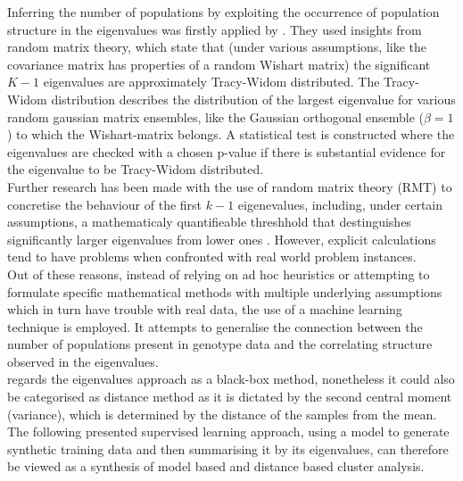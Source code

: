 \documentclass[a4paper, 11pt]{article}
\begin{document}
Inferring the number of populations by exploiting the occurrence of population structure in the eigenvalues was firstly applied by \cite{patterson2006population}. They used insights from random matrix theory, which state that (under various assumptions, like the covariance matrix has properties of a random Wishart matrix) the significant $K-1$ eigenvalues are approximately Tracy-Widom distributed. The Tracy-Widom distribution describes the distribution of the largest eigenvalue for various random gaussian matrix ensembles, like the Gaussian orthogonal ensemble ($\beta = 1$) to which the Wishart-matrix belongs. A statistical test is constructed where the eigenvalues are checked with a chosen p-value if there is substantial evidence for the eigenvalue to be Tracy-Widom distributed.\\
Further research has been made with the use of random matrix theory (RMT) to concretise the behaviour of the first $k-1$ eigenevalues, including, under certain assumptions, a mathematicaly quantifieable threshhold that destinguishes significantly larger eigenvalues from lower ones \parencite{bryc2013separation}. However, explicit calculations tend to have problems when confronted with real world problem instances.\\
Out of these reasons, instead of relying on ad hoc heuristics or attempting to formulate specific mathematical methods with multiple underlying assumptions which in turn have trouble with real data, the use of a machine learning technique is employed. It attempts to generalise the connection between the number of populations present in genotype data and the correlating structure observed in the eigenvalues.\\
\cite{patterson2006population} regards the eigenvalues approach as a black-box method, nonetheless it could also be categorised as distance method as it is dictated by the second central moment (variance), which is determined by the distance of the samples from the mean. The following presented supervised learning approach, using a model to generate synthetic training data and then summarising it by its eigenvalues, can therefore be viewed as a synthesis of model based and distance based cluster analysis.
\end{document}
